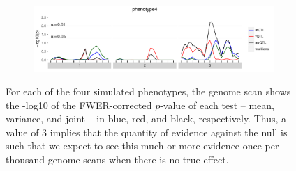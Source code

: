 \documentclass[9pt,twocolumn,twoside]{gsag3jnl}
\begin{document}
\begin{figure}[t]
    \begin{subfigure}[b]{\linewidth}
        \includegraphics[width=\textwidth]{images/empir_p_scan_phenotype4.pdf}
    \end{subfigure}

    \caption{For each of the four simulated phenotypes, the genome scan shows the -log10 of the FWER-corrected $p$-value of each test -- mean, variance, and joint -- in blue, red, and black, respectively. Thus, a value of 3 implies that the quantity of evidence against the null is such that we expect to see this much or more evidence once per thousand genome scans when there is no true effect. \label{fig:empir_p_scans}}
\end{figure}



\end{document}
